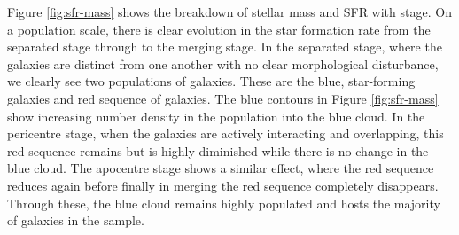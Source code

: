 Figure \ref{fig:sfr-mass} shows the breakdown of stellar mass and SFR with stage. On a population scale, there is clear evolution in the star formation rate from the separated stage through to the merging stage. In the separated stage, where the galaxies are distinct from one another with no clear morphological disturbance, we clearly see two populations of galaxies. These are the blue, star-forming galaxies and red sequence of galaxies. The blue contours in Figure \ref{fig:sfr-mass} show increasing number density in the population into the blue cloud. In the pericentre stage, when the galaxies are actively interacting and overlapping, this red sequence remains but is highly diminished while there is no change in the blue cloud. The apocentre stage shows a similar effect, where the red sequence reduces again before finally in merging the red sequence completely disappears. Through these, the blue cloud remains highly populated and hosts the majority of galaxies in the sample.

